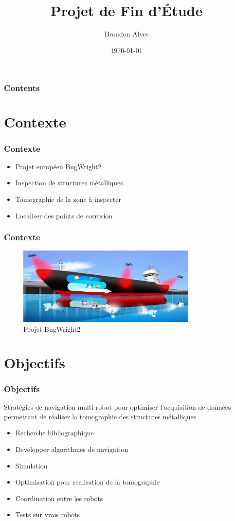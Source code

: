 \documentclass{beamer}
\title[Projet de Fin d'Étude]{Projet de Fin d'Étude}
\author{Brandon Alves}
\institute[INSA Lyon]{
	\huge{Dossier d'initialisation}
}
\date{\today}
\begin{document}
	\begin{frame}
		\titlepage
	\end{frame}
	\begin{frame}
		\frametitle{Contents}
		\tableofcontents
	\end{frame}
	\section{Contexte}
		\begin{frame}
			\frametitle{Contexte}
			\begin{itemize}
				\item Projet européen BugWright2
				\item Inspection de structures métalliques
				\item Tomographie de la zone à inspecter
				\item Localiser des points de corrosion
			\end{itemize}
		\end{frame}
		\begin{frame}
			\frametitle{Contexte}
			\begin{figure}
				\centering
				\includegraphics[width=0.8\textwidth]{graphics/Concept-Cartoon-NJ3-e1582812224528.jpg}
				\caption{Projet BugWright2}
			\end{figure}
		\end{frame}
	\section{Objectifs}
		\begin{frame}
			\frametitle{Objectifs}
			Stratégies de navigation multi-robot pour optimiser l'acquisition de données permettant de réaliser la tomographie des structures métalliques
			\begin{itemize}
				\item Recherche bibliographique
				\item Developper algorithmes de navigation
				\item Simulation
				\item Optimisation pour realisation de la tomographie
				\item Coordination entre les robots
				\item Tests sur vrais robots
			\end{itemize}
		\end{frame}
\end{document}
